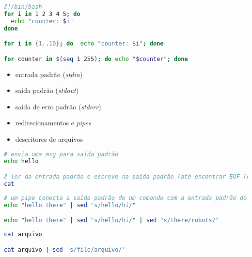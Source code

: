 \begin{frame}
\framebreak

\begin{lstlisting}[language=bash, label=lst-bash-simple-loop, caption={Criando um loop simples.}, postbreak=\mbox{$\hookrightarrow$\space}, basicstyle=\fontsize{8}{10}\selectfont\ttfamily]
#!/bin/bash
for i in 1 2 3 4 5; do
  echo "counter: $i"
done

for i in {1..10}; do  echo "counter: $i"; done

for counter in $(seq 1 255); do echo "$counter"; done
\end{lstlisting}

\framebreak

\begin{itemize}
\item entrada padrão (\emph{stdin})
\item saída padrão (\emph{stdout})
\item saída de erro padrão (\emph{stderr})
\item redirecionamentos e \emph{pipes}
\item descritores de arquivos
\end{itemize}

\begin{lstlisting}[language=bash, label=lst-bash-stds, caption={Entrada e saída padrão.}, postbreak=\mbox{$\hookrightarrow$\space}, basicstyle=\fontsize{8}{10}\selectfont\ttfamily]
# envia uma msg para saída padrão
echo hello

# ler da entrada padrão e escreve na saída padrão (até encontrar EOF (ctrl+d))
cat
\end{lstlisting}

\begin{lstlisting}[language=bash, label=lst-bash-pipe, caption={Pipes.}, postbreak=\mbox{$\hookrightarrow$\space}, basicstyle=\fontsize{8}{10}\selectfont\ttfamily]
# um pipe conecta a saída padrão de um comando com a entrada padrão do próximo
echo "hello there" | sed "s/hello/hi/"

echo "hello there" | sed "s/hello/hi/" | sed "s/there/robots/"
\end{lstlisting}

\begin{lstlisting}[language=bash, label=lst-bash-stderr, caption={Erros.}, postbreak=\mbox{$\hookrightarrow$\space}, basicstyle=\fontsize{8}{10}\selectfont\ttfamily]
cat arquivo 

cat arquivo | sed 's/file/arquivo/'
\end{lstlisting}



\end{frame}
